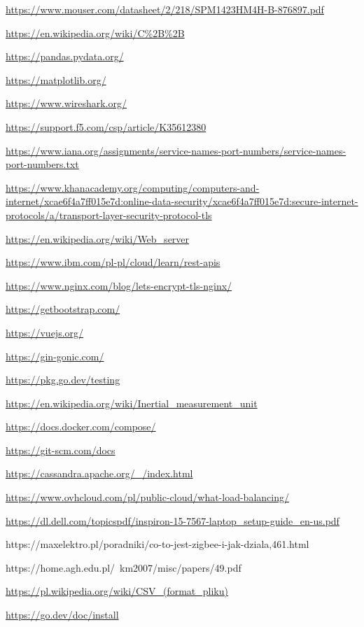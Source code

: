 \documentclass[12pt,oneside,a4paper]{book}
\theoremstyle{break}
\begin{document}
\begin{thebibliography}{00}
    \url{https://www.mouser.com/datasheet/2/218/SPM1423HM4H-B-876897.pdf}

    \url{https://en.wikipedia.org/wiki/C%2B%2B}

    \url{https://pandas.pydata.org/}

    \url{https://matplotlib.org/}

    \url{https://www.wireshark.org/}

    \url{https://support.f5.com/csp/article/K35612380}

    \url{https://www.iana.org/assignments/service-names-port-numbers/service-names-port-numbers.txt}
    
    \url{https://www.khanacademy.org/computing/computers-and-internet/xcae6f4a7ff015e7d:online-data-security/xcae6f4a7ff015e7d:secure-internet-protocols/a/transport-layer-security-protocol-tls}

    \url{https://en.wikipedia.org/wiki/Web_server}

    \url{https://www.ibm.com/pl-pl/cloud/learn/rest-apis}

    \url{https://www.nginx.com/blog/lets-encrypt-tls-nginx/}

    \url{https://getbootstrap.com/}

    \url{https://vuejs.org/}

    \url{https://gin-gonic.com/}

    \url{https://pkg.go.dev/testing}

    \url{https://en.wikipedia.org/wiki/Inertial_measurement_unit}

    \url{https://docs.docker.com/compose/}

    \url{https://git-scm.com/docs}

    \url{https://cassandra.apache.org/_/index.html}

    \url{https://www.ovhcloud.com/pl/public-cloud/what-load-balancing/}

    \url{https://dl.dell.com/topicspdf/inspiron-15-7567-laptop_setup-guide_en-us.pdf}

    https://maxelektro.pl/poradniki/co-to-jest-zigbee-i-jak-dziala,461.html

    https://home.agh.edu.pl/~km2007/misc/papers/49.pdf
    
    \url{https://pl.wikipedia.org/wiki/CSV_(format_pliku)}

    \url{https://go.dev/doc/install}

\end{thebibliography}
\end{document}

